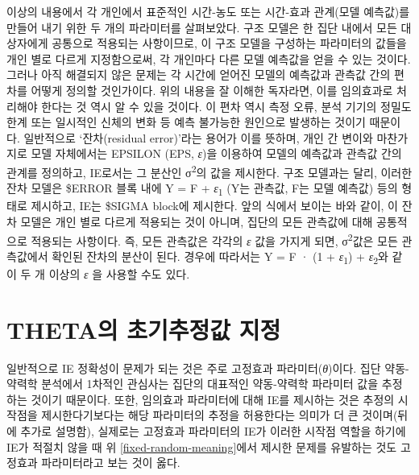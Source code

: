 \documentclass[
  11pt,
  krantz2, a4paper, twoside]{krantz}
\theoremstyle{definition}
\theoremstyle{definition}
\theoremstyle{definition}
\theoremstyle{remark}
\begin{document}
이상의 내용에서 각 개인에서 표준적인 시간-농도 또는 시간-효과 관계(모델 예측값)를 만들어 내기 위한 두 개의 파라미터를 살펴보았다. 구조 모델은 한 집단 내에서 모든 대상자에게 공통으로 적용되는 사항이므로, 이 구조 모델을 구성하는 파라미터의 값들을 개인 별로 다르게 지정함으로써, 각 개인마다 다른 모델 예측값을 얻을 수 있는 것이다. 그러나 아직 해결되지 않은 문제는 각 시간에 얻어진 모델의 예측값과 관측값 간의 편차를 어떻게 정의할 것인가이다. 위의 내용을 잘 이해한 독자라면, 이를 임의효과로 처리해야 한다는 것 역시 알 수 있을 것이다. 이 편차 역시 측정 오류, 분석 기기의 정밀도 한계 또는 일시적인 신체의 변화 등 예측 불가능한 원인으로 발생하는 것이기 때문이다. 일반적으로 `잔차(residual error)'라는 용어가 이를 뜻하며, 개인 간 변이와 마찬가지로 모델 자체에서는 EPSILON (EPS, \emph{ε})을 이용하여 모델의 예측값과 관측값 간의 관계를 정의하고, IE로서는 그 분산인 σ\textsuperscript{2}의 값을 제시한다. 구조 모델과는 달리, 이러한 잔차 모델은 \$ERROR 블록 내에 Y = F + \emph{ε}\textsubscript{1} (Y는 관측값, F는 모델 예측값) 등의 형태로 제시하고, IE는 \$SIGMA block에 제시한다. 앞의 식에서 보이는 바와 같이, 이 잔차 모델은 개인 별로 다르게 적용되는 것이 아니며, 집단의 모든 관측값에 대해 공통적으로 적용되는 사항이다. 즉, 모든 관측값은 각각의 \emph{ε} 값을 가지게 되면, σ\textsuperscript{2}값은 모든 관측값에서 확인된 잔차의 분산이 된다. 경우에 따라서는 Y = F · (1 + \emph{ε}\textsubscript{1}) + \emph{ε}\textsubscript{2}와 같이 두 개 이상의 \emph{ε} 을 사용할 수도 있다.

\hypertarget{thetauxc758-uxcd08uxae30uxcd94uxc815uxac12-uxc9c0uxc815}{%
\section{THETA의 초기추정값 지정}\label{thetauxc758-uxcd08uxae30uxcd94uxc815uxac12-uxc9c0uxc815}}

일반적으로 IE 정확성이 문제가 되는 것은 주로 고정효과 파라미터(\emph{θ})이다. 집단 약동-약력학 분석에서 1차적인 관심사는 집단의 대표적인 약동-약력학 파라미터 값을 추정하는 것이기 때문이다. 또한, 임의효과 파라미터에 대해 IE를 제시하는 것은 추정의 시작점을 제시한다기보다는 해당 파라미터의 추정을 허용한다는 의미가 더 큰 것이며(뒤에 추가로 설명함), 실제로는 고정효과 파라미터의 IE가 이러한 시작점 역할을 하기에 IE가 적절치 않을 때 위 \ref{fixed-random-meaning}에서 제시한 문제를 유발하는 것도 고정효과 파라미터라고 보는 것이 옳다.
\end{document}
